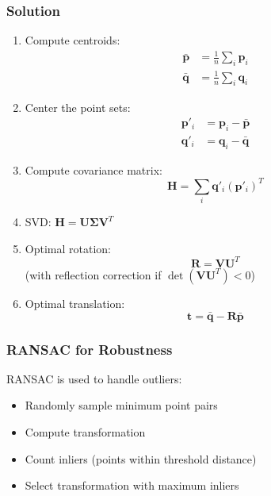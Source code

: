 \documentclass[11pt,a4paper]{article}
\begin{document}
\subsubsection{Solution}

\begin{enumerate}
    \item Compute centroids:
    \begin{align}
    \bar{\mathbf{p}} &= \frac{1}{n}\sum_i \mathbf{p}_i \nonumber \\
    \bar{\mathbf{q}} &= \frac{1}{n}\sum_i \mathbf{q}_i \nonumber
    \end{align}
    
    \item Center the point sets:
    \begin{align}
    \mathbf{p}'_i &= \mathbf{p}_i - \bar{\mathbf{p}} \nonumber \\
    \mathbf{q}'_i &= \mathbf{q}_i - \bar{\mathbf{q}} \nonumber
    \end{align}
    
    \item Compute covariance matrix:
    \begin{equation}
    \mathbf{H} = \sum_i \mathbf{q}'_i (\mathbf{p}'_i)^T
    \end{equation}
    
    \item SVD: $\mathbf{H} = \mathbf{U}\mathbf{\Sigma}\mathbf{V}^T$
    
    \item Optimal rotation:
    \begin{equation}
    \mathbf{R} = \mathbf{V}\mathbf{U}^T
    \end{equation}
    (with reflection correction if $\det(\mathbf{V}\mathbf{U}^T) < 0$)
    
    \item Optimal translation:
    \begin{equation}
    \mathbf{t} = \bar{\mathbf{q}} - \mathbf{R}\bar{\mathbf{p}}
    \end{equation}
\end{enumerate}

\subsubsection{RANSAC for Robustness}

RANSAC is used to handle outliers:
\begin{itemize}
    \item Randomly sample minimum point pairs
    \item Compute transformation
    \item Count inliers (points within threshold distance)
    \item Select transformation with maximum inliers
\end{itemize}
\end{document}
